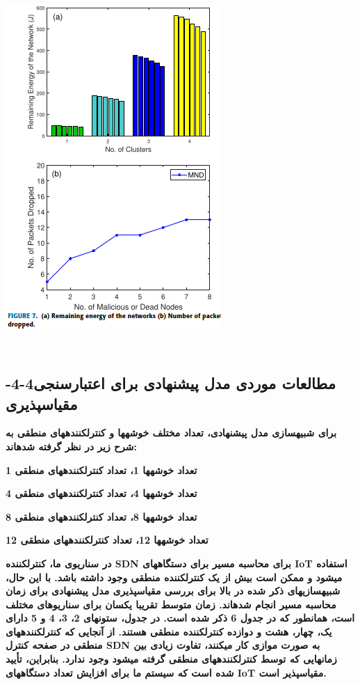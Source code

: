 \documentclass{article} %
\begin{document}
\noindent 
{\bf \includegraphics*[width=3.23in, height=5.46in]{image18}}

\noindent 
\subsection{ -4-4مطالعات موردی مدل پیشنهادی برای اعتبارسنجی مقیاسپذیری}

\noindent 
{\bf برای شبیهسازی مدل پیشنهادی، تعداد مختلف خوشهها و کنترلکنندههای منطقی به شرح زیر در نظر گرفته شدهاند:}

\noindent 
{\bf  تعداد خوشهها 1، تعداد کنترلکنندههای منطقی 1}

\noindent 
{\bf  تعداد خوشهها 4، تعداد کنترلکنندههای منطقی 4}

\noindent 
{\bf  تعداد خوشهها 8، تعداد کنترلکنندههای منطقی 8}

\noindent 
{\bf  تعداد خوشهها 12، تعداد کنترلکنندههای منطقی 12}

\noindent 
{\bf در سناریوی ما، کنترلکننده SDN برای محاسبه مسیر برای دستگاههای IoT استفاده میشود و ممکن است بیش از یک کنترلکننده منطقی وجود داشته باشد. با این حال، شبیهسازیهای ذکر شده در بالا برای بررسی مقیاسپذیری مدل پیشنهادی برای زمان محاسبه مسیر انجام شدهاند. زمان متوسط تقریبا یکسان برای سناریوهای مختلف است، همانطور که در جدول 6 ذکر شده است. در جدول، ستونهای 2، 3، 4 و 5 دارای یک، چهار، هشت و دوازده کنترلکننده منطقی هستند. از آنجایی که کنترلکنندههای منطقی در صفحه کنترل SDN به صورت موازی کار میکنند، تفاوت زیادی بین زمانهایی که توسط کنترلکنندههای منطقی گرفته میشود وجود ندارد. بنابراین، تأیید شده است که سیستم ما برای افزایش تعداد دستگاههای IoT مقیاسپذیر است.}
\end{document}
